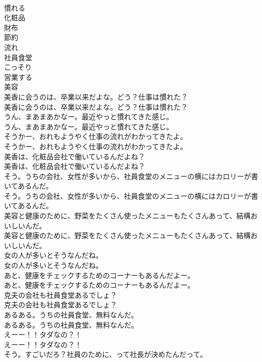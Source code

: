 \documentclass[8pt]{extreport}
\begin{document}
\begin{CJK}{UTF8}{min}
\\	慣れる
\\	化粧品
\\	財布
\\	節約
\\	流れ
\\	社員食堂
\\	こっそり
\\	営業する
\\	美容
\\	美香に会うのは、卒業以来だよな。どう？仕事は慣れた？	
\\	美香に会うのは、卒業以来だよな。どう？仕事は慣れた？ 
\\	うん、まあまあかなー。最近やっと慣れてきた感じ。	
\\	うん、まあまあかなー。最近やっと慣れてきた感じ。 
\\	そうかー、おれもようやく仕事の流れがわかってきたよ。	
\\	そうかー、おれもようやく仕事の流れがわかってきたよ。 
\\	美香は、化粧品会社で働いているんだよね？	
\\	美香は、化粧品会社で働いているんだよね？ 
\\	そう。うちの会社、女性が多いから、社員食堂のメニューの横にはカロリーが書いてあるんだ。	
\\	そう。うちの会社、女性が多いから、社員食堂のメニューの横にはカロリーが書いてあるんだ。 
\\	美容と健康のために、野菜をたくさん使ったメニューもたくさんあって、結構おいしいんだ。	
\\	美容と健康のために、野菜をたくさん使ったメニューもたくさんあって、結構おいしいんだ。 
\\	女の人が多いとそうなんだね。	
\\	女の人が多いとそうなんだね。 
\\	あと、健康をチェックするためのコーナーもあるんだよー。	
\\	あと、健康をチェックするためのコーナーもあるんだよー。 
\\	克夫の会社も社員食堂あるでしょ？	
\\	克夫の会社も社員食堂あるでしょ？ 
\\	あるある。うちの社員食堂、無料なんだ。	
\\	あるある。うちの社員食堂、無料なんだ。 
\\	えーー！！タダなの？！	
\\	えーー！！タダなの？！ 
\\	そう。すごいだろ？社員のために、って社長が決めたんだって。	

\end{CJK}
\end{document}
